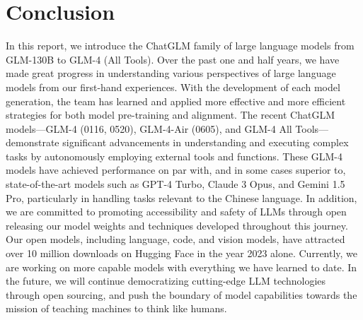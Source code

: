 \section{Conclusion}

In this report, we introduce the ChatGLM family of large language models from GLM-130B to GLM-4 (All Tools). 
Over the past one and half years, we have made great progress in understanding various perspectives of large language models from our first-hand experiences. 
With the development of each model generation, the team has learned and applied more effective and more efficient  strategies for both model pre-training and alignment. 
The recent ChatGLM models---GLM-4 (0116, 0520), GLM-4-Air (0605), and GLM-4 All Tools---demonstrate significant advancements in understanding and executing complex tasks by autonomously employing external tools and functions. 
These GLM-4 models have achieved performance on par with, and in some cases superior to, state-of-the-art models such as GPT-4 Turbo, Claude 3 Opus, and Gemini 1.5 Pro, particularly in handling tasks relevant to the Chinese language. 
In addition, we are committed to promoting accessibility and safety of LLMs through open releasing our model weights and techniques developed throughout this journey. 
Our open models, including language, code, and vision models, have attracted over 10 million downloads on Hugging Face in the year 2023 alone. 
Currently, we are working on more capable models with everything we have learned to date. 
In the future, we will continue democratizing cutting-edge LLM technologies through open sourcing, and push the boundary of model capabilities towards the mission of teaching machines to think like humans.
